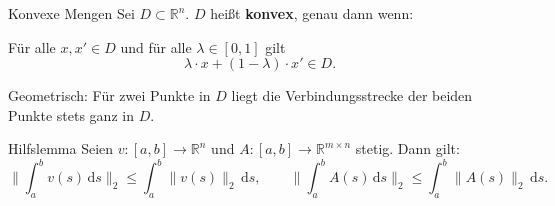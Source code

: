 \begin{definition}{Konvexe Mengen}
    Sei $D\subset\mathbb{R}^n$. $D$ heißt \textbf{konvex}, genau dann wenn:

    Für alle $x,x'\in D$ und für alle $\lambda\in[0,1]$ gilt
    $$
    \lambda\cdot x + (1-\lambda)\cdot x' \in D.
    $$

    Geometrisch: Für zwei Punkte in $D$ liegt die Verbindungsstrecke der beiden Punkte stets ganz in $D$.
\end{definition}

\begin{lemma}{Hilfslemma}
    Seien $v:[a,b]\to\mathbb{R}^n$ und $A:[a,b]\to\mathbb{R}^{m\times n}$ stetig. Dann gilt:
    $$
    \Big\|\int_a^b v(s)\,\mathrm{d}s\Big\|_2 \le \int_a^b \|v(s)\|_2 \,\mathrm{d}s,
    \qquad
    \Big\|\int_a^b A(s)\,\mathrm{d}s\Big\|_2 \le \int_a^b \|A(s)\|_2 \,\mathrm{d}s.
    $$
\end{lemma}